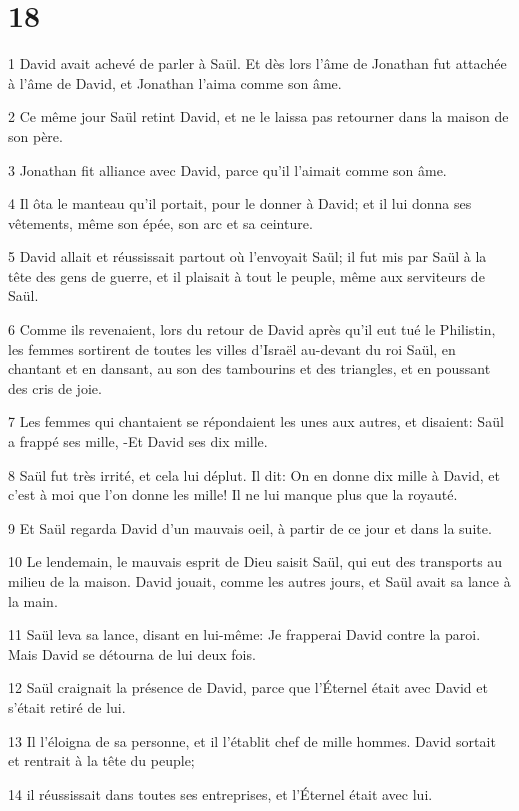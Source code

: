 \chapter{18}

\par 1 David avait achevé de parler à Saül. Et dès lors l'âme de Jonathan fut attachée à l'âme de David, et Jonathan l'aima comme son âme.
\par 2 Ce même jour Saül retint David, et ne le laissa pas retourner dans la maison de son père.
\par 3 Jonathan fit alliance avec David, parce qu'il l'aimait comme son âme.
\par 4 Il ôta le manteau qu'il portait, pour le donner à David; et il lui donna ses vêtements, même son épée, son arc et sa ceinture.
\par 5 David allait et réussissait partout où l'envoyait Saül; il fut mis par Saül à la tête des gens de guerre, et il plaisait à tout le peuple, même aux serviteurs de Saül.
\par 6 Comme ils revenaient, lors du retour de David après qu'il eut tué le Philistin, les femmes sortirent de toutes les villes d'Israël au-devant du roi Saül, en chantant et en dansant, au son des tambourins et des triangles, et en poussant des cris de joie.
\par 7 Les femmes qui chantaient se répondaient les unes aux autres, et disaient: Saül a frappé ses mille, -Et David ses dix mille.
\par 8 Saül fut très irrité, et cela lui déplut. Il dit: On en donne dix mille à David, et c'est à moi que l'on donne les mille! Il ne lui manque plus que la royauté.
\par 9 Et Saül regarda David d'un mauvais oeil, à partir de ce jour et dans la suite.
\par 10 Le lendemain, le mauvais esprit de Dieu saisit Saül, qui eut des transports au milieu de la maison. David jouait, comme les autres jours, et Saül avait sa lance à la main.
\par 11 Saül leva sa lance, disant en lui-même: Je frapperai David contre la paroi. Mais David se détourna de lui deux fois.
\par 12 Saül craignait la présence de David, parce que l'Éternel était avec David et s'était retiré de lui.
\par 13 Il l'éloigna de sa personne, et il l'établit chef de mille hommes. David sortait et rentrait à la tête du peuple;
\par 14 il réussissait dans toutes ses entreprises, et l'Éternel était avec lui.
